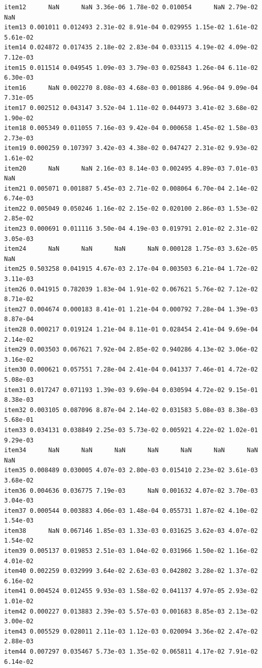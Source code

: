 \documentclass[
  a4paper,
]{ltjsbook}
\begin{document}
\begin{verbatim}
item12      NaN      NaN 3.36e-06 1.78e-02 0.010054      NaN 2.79e-02      NaN
item13 0.001011 0.012493 2.31e-02 8.91e-04 0.029955 1.15e-02 1.61e-02 5.61e-02
item14 0.024872 0.017435 2.18e-02 2.83e-04 0.033115 4.19e-02 4.09e-02 7.12e-03
item15 0.011514 0.049545 1.09e-03 3.79e-03 0.025843 1.26e-04 6.11e-02 6.30e-03
item16      NaN 0.002270 8.08e-03 4.68e-03 0.001886 4.96e-04 9.09e-04 7.31e-05
item17 0.002512 0.043147 3.52e-04 1.11e-02 0.044973 3.41e-02 3.68e-02 1.90e-02
item18 0.005349 0.011055 7.16e-03 9.42e-04 0.000658 1.45e-02 1.58e-03 2.73e-03
item19 0.000259 0.107397 3.42e-03 4.38e-02 0.047427 2.31e-02 9.93e-02 1.61e-02
item20      NaN      NaN 2.16e-03 8.14e-03 0.002495 4.89e-03 7.01e-03      NaN
item21 0.005071 0.001887 5.45e-03 2.71e-02 0.008064 6.70e-04 2.14e-02 6.74e-03
item22 0.005049 0.050246 1.16e-02 2.15e-02 0.020100 2.86e-03 1.53e-02 2.85e-02
item23 0.000691 0.011116 3.50e-04 4.19e-03 0.019791 2.01e-02 2.31e-02 3.05e-03
item24      NaN      NaN      NaN      NaN 0.000128 1.75e-03 3.62e-05      NaN
item25 0.503258 0.041915 4.67e-03 2.17e-04 0.003503 6.21e-04 1.72e-02 3.11e-03
item26 0.041915 0.782039 1.83e-04 1.91e-02 0.067621 5.76e-02 7.12e-02 8.71e-02
item27 0.004674 0.000183 8.41e-01 1.21e-04 0.000792 7.28e-04 1.39e-03 8.87e-04
item28 0.000217 0.019124 1.21e-04 8.11e-01 0.028454 2.41e-04 9.69e-04 2.14e-02
item29 0.003503 0.067621 7.92e-04 2.85e-02 0.940286 4.13e-02 3.06e-02 3.16e-02
item30 0.000621 0.057551 7.28e-04 2.41e-04 0.041337 7.46e-01 4.72e-02 5.08e-03
item31 0.017247 0.071193 1.39e-03 9.69e-04 0.030594 4.72e-02 9.15e-01 8.38e-03
item32 0.003105 0.087096 8.87e-04 2.14e-02 0.031583 5.08e-03 8.38e-03 5.68e-01
item33 0.034131 0.038849 2.25e-03 5.73e-02 0.005921 4.22e-02 1.02e-01 9.29e-03
item34      NaN      NaN      NaN      NaN      NaN      NaN      NaN      NaN
item35 0.008489 0.030005 4.07e-03 2.80e-03 0.015410 2.23e-02 3.61e-03 3.68e-02
item36 0.004636 0.036775 7.19e-03      NaN 0.001632 4.07e-02 3.70e-03 3.04e-03
item37 0.000544 0.003883 4.06e-03 1.48e-04 0.055731 1.87e-02 4.10e-02 1.54e-03
item38      NaN 0.067146 1.85e-03 1.33e-03 0.031625 3.62e-03 4.07e-02 1.54e-02
item39 0.005137 0.019853 2.51e-03 1.04e-02 0.031966 1.50e-02 1.16e-02 4.01e-02
item40 0.002259 0.032999 3.64e-02 2.63e-03 0.042802 3.28e-02 1.37e-02 6.16e-02
item41 0.004524 0.012455 9.93e-03 1.58e-02 0.041137 4.97e-05 2.93e-02 1.01e-02
item42 0.000227 0.013883 2.39e-03 5.57e-03 0.001683 8.85e-03 2.13e-02 3.00e-02
item43 0.005529 0.028011 2.11e-03 1.12e-03 0.020094 3.36e-02 2.47e-02 2.88e-03
item44 0.007297 0.035467 5.73e-03 1.35e-02 0.065811 4.17e-02 7.91e-02 6.14e-02

\end{verbatim}
\end{document}
